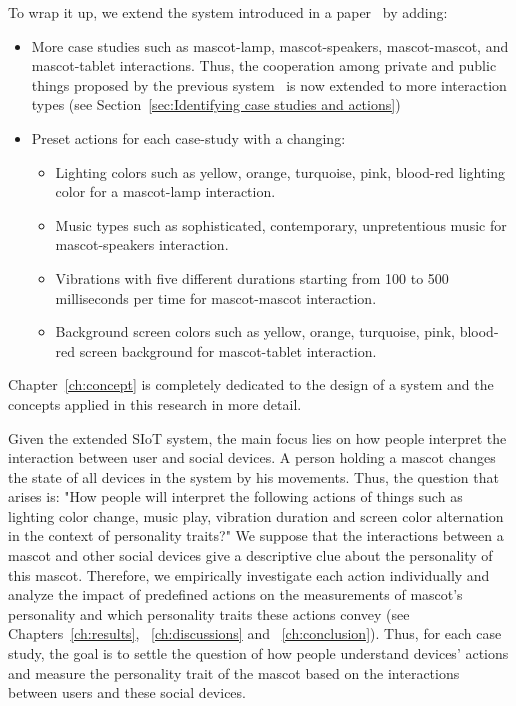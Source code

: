 To wrap it up, we extend the system introduced in a paper~\cite{okada2016autonomous} by adding:
\begin{itemize}
    \item More case studies such as mascot-lamp, mascot-speakers, mascot-mascot, and mascot-tablet interactions.
    Thus, the cooperation among private and public things proposed by the previous system~\cite{okada2016autonomous}
    is now extended to more interaction types (see Section~\ref{sec:Identifying case studies and actions})
    \item Preset actions for each case-study with a changing:
    \begin{itemize}
        \item Lighting colors such as yellow, orange, turquoise, pink, blood-red lighting color for a mascot-lamp interaction.
        \item Music types such as sophisticated, contemporary, unpretentious music for mascot-speakers interaction.
        \item Vibrations with five different durations starting from 100 to
        500 milliseconds per time for mascot-mascot interaction.
        \item Background screen colors such as yellow, orange, turquoise, pink, blood-red screen background for mascot-tablet interaction.
    \end{itemize}
\end{itemize}
Chapter~\ref{ch:concept} is completely dedicated to the design of a system and
the concepts applied in this research in more detail.

Given the extended SIoT system, the main focus lies on how people interpret
the interaction between user and social devices.
A person holding a mascot changes the state of all devices in the system by his movements.
Thus, the question that arises is: "How people will interpret the following actions of things such as
lighting color change, music play, vibration duration and screen color
alternation in the context of personality traits?"
We suppose that the interactions between a mascot and other social
devices give a descriptive clue about the personality of this mascot.
Therefore, we empirically investigate each action individually and analyze the impact of predefined
actions on the measurements of mascot's personality and which personality traits
these actions convey (see Chapters~\ref{ch:results}, ~\ref{ch:discussions} and ~\ref{ch:conclusion}).
Thus, for each case study, the goal is to settle the question of how people understand devices' actions
and measure the personality trait of the mascot based on the interactions between users and these social devices.

